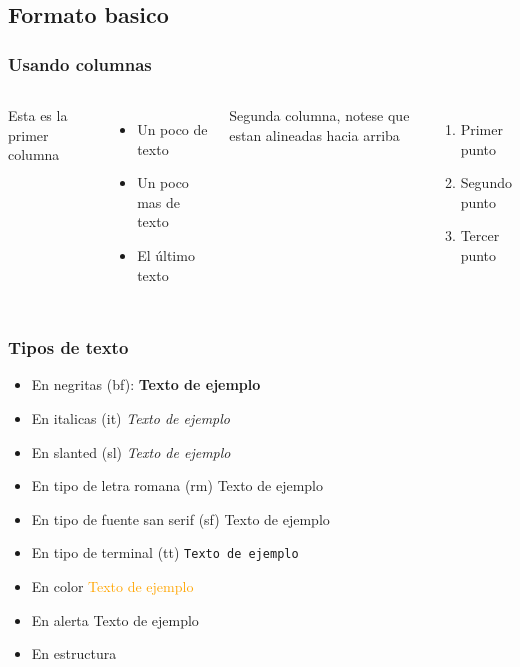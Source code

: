 \documentclass{beamer}
\begin{document}
\subsection{Formato basico} 
\begin{frame}
\frametitle{Usando columnas}
\begin{columns}
     Esta es la primer columna
     \begin{itemize}
         \item Un poco de texto
         \item Un poco mas de texto
         \item El último texto
     \end{itemize}
     Segunda columna, notese que estan alineadas hacia arriba
     \begin{enumerate}
         \item Primer punto
         \item Segundo punto
         \item Tercer punto
     \end{enumerate}
\end{columns}
\end{frame}

\begin{frame}
\frametitle{Tipos de texto}
  \begin{itemize}
    \item En negritas (bf):  \textbf{Texto de ejemplo}
    \item En italicas (it) \textit{Texto de ejemplo}
    \item En slanted (sl) \textsl{Texto de ejemplo}
    \item En tipo de letra romana (rm) \textrm{Texto de ejemplo}
    \item En tipo de fuente san serif (sf) \textsf{Texto de ejemplo}
    \item En tipo de terminal (tt) \texttt{Texto de ejemplo}
    \item En color \textcolor{orange}{Texto de ejemplo}
    \item En alerta \alert{Texto de ejemplo}
    \item En estructura 
  \end{itemize}
\end{frame}
\end{document}
